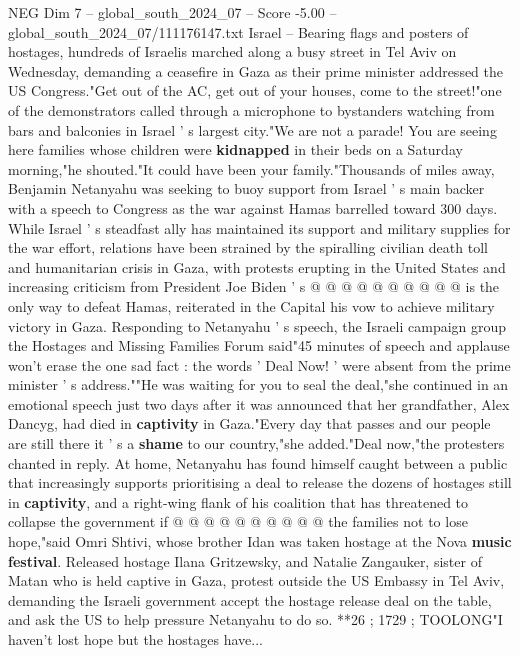 \begin{textsample}{NEG Dim 7 – global\_south\_2024\_07 – Score -5.00 – global\_south\_2024\_07/111176147.txt}  \label{ex:f7_neg_335}
Israel -- Bearing flags and posters of hostages, hundreds of Israelis marched along a busy street in Tel Aviv on Wednesday, demanding a ceasefire in Gaza as their prime minister addressed the US Congress."Get out of the AC, get out of your houses, come to the street!"one of the demonstrators called through a microphone to bystanders watching from bars and balconies in Israel ' s largest city."We are not a parade!
You are seeing here families whose children were \textbf{kidnapped} in their beds on a Saturday morning,"he shouted."It could have been your family."Thousands of miles away, Benjamin Netanyahu was seeking to buoy support from Israel ' s main backer with a speech to Congress as the war against Hamas barrelled toward 300 days.
While Israel ' s steadfast ally has maintained its support and military supplies for the war effort, relations have been strained by the spiralling civilian death toll and humanitarian crisis in Gaza, with protests erupting in the United States and increasing criticism from President Joe Biden ' s @ @ @ @ @ @ @ @ @ @ is the only way to defeat Hamas, reiterated in the Capital his vow to achieve military victory in Gaza.
Responding to Netanyahu ' s speech, the Israeli campaign group the Hostages and Missing Families Forum said"45 minutes of speech and applause won't erase the one sad fact : the words ' Deal Now! ' were absent from the prime minister ' s address.""He was waiting for you to seal the deal,"she continued in an emotional speech just two days after it was announced that her grandfather, Alex Dancyg, had died in \textbf{captivity} in Gaza."Every day that passes and our people are still there it ' s a \textbf{shame} to our country,"she added."Deal now,"the protesters chanted in reply.
At home, Netanyahu has found himself caught between a public that increasingly supports prioritising a deal to release the dozens of hostages still in \textbf{captivity}, and a right-wing flank of his coalition that has threatened to collapse the government if @ @ @ @ @ @ @ @ @ @ the families not to lose hope,"said Omri Shtivi, whose brother Idan was taken hostage at the Nova \textbf{music} \textbf{festival}.
Released hostage Ilana Gritzewsky, and Natalie Zangauker, sister of Matan who is held captive in Gaza, protest outside the US Embassy in Tel Aviv, demanding the Israeli government accept the hostage release deal on the table, and ask the US to help pressure Netanyahu to do so. **26 ; 1729 ; TOOLONG"I haven't lost hope but the hostages have...

\end{textsample}
